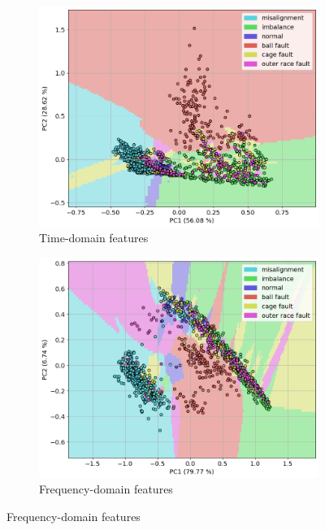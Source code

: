\begin{figure}[h]
    \centering
    \begin{subfigure}[b]{0.48\textwidth}
        \includegraphics[width=\textwidth]{assets/results/labels/PCA-TD.png}
        \caption{Time-domain features}
    \end{subfigure}
    \hfill
    \begin{subfigure}[b]{0.48\textwidth}
        \includegraphics[width=\textwidth]{assets/results/labels/PCA-FD.png}
        \caption{Frequency-domain features}
    \end{subfigure}
    \hfill

\end{figure}
